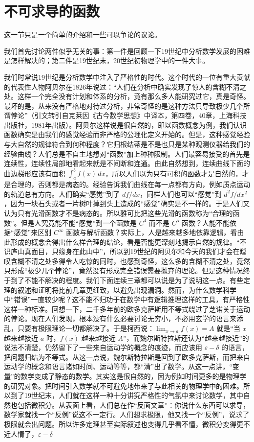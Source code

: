 \section{不可求导的函数}

这一节只是一个简单的介绍和一些可以争论的议论。

我们首先讨论两件似乎无关的事：第一件是回顾一下19世纪中分析数学发展的困难是怎样解决的；第二件是19世纪末，20世纪初物理学中的一件大事。

我们时常说19世纪是分析数学中注入了严格性的时代。这个时代的一位有重大贡献的代表性人物阿贝尔在1826年说过：“人们在分析中确实发现了惊人的含糊不清之处。这样一个完全没有计划和体系的分析，竟有那么多人能研究过它，真是奇怪。最坏的是，从来没有严格地对待过分析，非常奇怪的是这种方法只导致极少几个所谓悖论”（引文转引自克莱因《古今数学思想》中译本，第四卷，40章，上海科技出版社，1981年出版）。阿贝尔这样说是很自然的，即以函数概念为例，我们认识函数确实是由我们的感觉经验而非严格的公理化定义开始的。但是，这种感觉经验与大自然的规律符合到何种程度？它归根结蒂是不是也只是某种观测仪器给我们的经验曲线？人们总是不自主地想对“函数”加上种种限制。人们最容易接受的首先是连续性，连续性局部地看起来就是不间断和连通。由此自然想到，连续曲线下面的曲边梯形应该有面积 $\int_a^b f(x)\,dx$，所以人们以为只有可积的函数才是自然的，才是合理的，否则都是病态的。经验告诉我们曲线在每一点都有方向，例如质点运动的轨道总有方向。人们确实“感觉”到了 $df/dx$，同样人们也可以“感觉”到 $d^2f/dx^2$，因为一块石头或者一片树叶掉到头上造成的“感觉”确实是不一样的。于是人们又认为只有光滑函数才不是病态的。所以雅可比把这些光滑的函数称为“合理的函数”。但是人究竟能不能“感觉”到一个函数是 $C^4$ 而不是 $C^5$ 函数？人能不能依据“感觉”来区别 $C^\infty$ 函数与解析函数？实际上，人是越来越多地依靠逻辑，看由此形成的概念会得出什么样合理的结论，看是否能更深刻地揭示自然的规律。“不识庐山真面目，只缘身在此山中”，所以到19世纪的阿贝尔和今天的我们才会在瞠叹含糊不清之处多得令人吃惊的同时，也感到奇怪，这么多的含糊不清之处，竟然只形成“极少几个悖论”，竟然没有形成完全错误需要抛弃的理论。但是这种情况终于到了不能不解决的程度。我们下面连续三章都可以说是为了说明这一点。有些定理的叙述和证明将比前几章更细致，以避免出现漏洞。然而，为什么数学科学中“错误”一直较少呢？这不能不归功于在数学中有逻辑推理这样的工具，有严格性这样一种标准。回想一下，二千多年前的欧多克萨斯用不等式绕过了芝诺关于运动的悖论。现在人们发现，根本没有什么必要讨论无穷小，不必用玄学的语言来添乱，只要有极限理论一切都解决了。于是柯西说：$\lim_{x\to a}f(x)=A$ 就是“当 $x$ 越来越接近 $a$ 时，$f(x)$ 越来越接近 $A$”，而魏尔斯特拉斯还认为“越来越接近”的说法不清楚，仍然留下了一些来自运动学的概念的痕迹，而应该用 $\varepsilon-\delta$ 的语言，把问题归结为不等式。从这一点说，魏尔斯特拉斯是回到了欧多克萨斯，而把来自运动学的概念和语言诸如时间、运动等等，都“清”出了数学。从这一点讲，“变量”的数学变成了静态的数学。其实这是很自然的，因为例如时间更多的是物理学的研究对象。把时间引入数学就不可避免地带来了与此相关的物理学中的困难。所以到了19世纪末，人们就在这样一种十分讲究严格性的气氛中来讨论数学，其中自然也包括微积分。从表面上看，人们总在作“反面文章”：你说什么东西可以求导，数学家就找一个“反例”说这不一定行。人们想求极限，他又找一个“反例”，说求了极限就会出问题。所以许多定理甚至实际叙述也变得几乎看不懂，微积分变得更不近人情了，$\varepsilon-\delta$ 